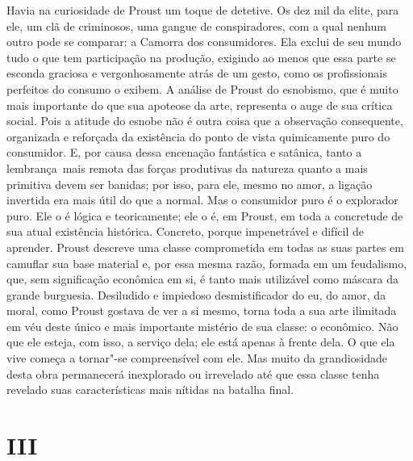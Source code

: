 Havia na curiosidade de Proust um toque de detetive. Os dez mil da
elite, para ele, um clã de criminosos, uma gangue de conspiradores, com
a qual nenhum outro pode se comparar: a Camorra dos consumidores. Ela
exclui de seu mundo tudo o que tem participação na produção, exigindo ao
menos que essa parte se esconda graciosa e vergonhosamente atrás de um
gesto, como os profissionais perfeitos do consumo o exibem. A análise de
Proust do esnobismo, que é muito mais importante do que sua apoteose da
arte, representa o auge de sua crítica social. Pois a atitude do esnobe
não é outra coisa que a observação consequente, organizada e reforçada
da existência do ponto de vista quimicamente puro do consumidor. E, por
causa dessa encenação fantástica e satânica, tanto a lembrança~mais
remota das forças produtivas da natureza quanto a mais primitiva devem
ser banidas; por isso, para ele, mesmo no amor, a ligação invertida era
mais útil do que a normal. Mas o consumidor puro é o explorador puro.
Ele o é lógica e teoricamente; ele o é, em Proust, em toda a concretude
de sua atual existência histórica. Concreto, porque impenetrável e
difícil de aprender. Proust descreve uma classe comprometida em todas as
suas partes em camuflar sua base material e, por essa mesma razão,
formada em um feudalismo, que, sem significação econômica em si, é tanto
mais utilizável como máscara da grande burguesia. Desiludido e impiedoso
desmistificador do eu, do amor, da moral, como Proust gostava de ver a
si mesmo, torna toda a sua arte ilimitada em véu deste único e mais
importante mistério de sua classe: o econômico. Não que ele esteja, com
isso, a serviço dela; ele está apenas à frente dela. O que ela vive
começa a tornar"-se compreensível com ele. Mas muito da grandiosidade
desta obra permanecerá inexplorado ou irrevelado até que essa classe
tenha revelado suas características mais nítidas na batalha final.

\section{III}

